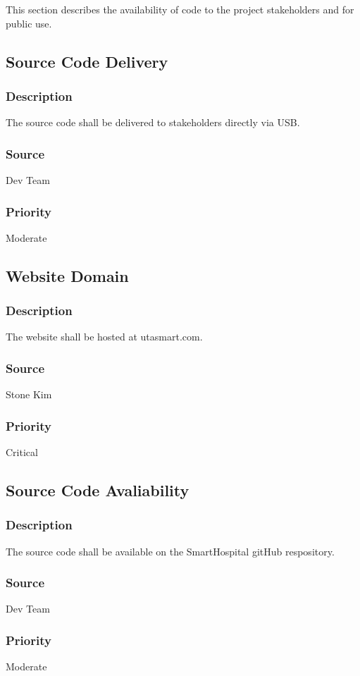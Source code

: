 This section describes the availability of code to the project stakeholders and for public use.

\subsection{Source Code Delivery}
\subsubsection{Description}
The source code shall be delivered to stakeholders directly via USB.
\subsubsection{Source}
Dev Team
\subsubsection{Priority}
Moderate

\subsection{Website Domain}
\subsubsection{Description}
The website shall be hosted at utasmart.com.
\subsubsection{Source}
Stone Kim
\subsubsection{Priority}
Critical

\subsection{Source Code Avaliability}
\subsubsection{Description}
The source code shall be available on the SmartHospital gitHub respository.
\subsubsection{Source}
Dev Team
\subsubsection{Priority}
Moderate